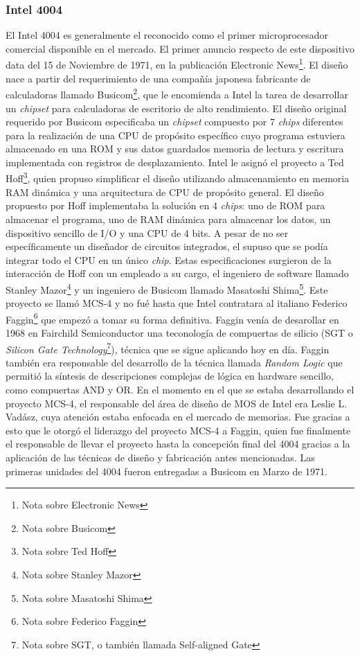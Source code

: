 \subsubsection{Intel 4004}

El Intel 4004 es generalmente el reconocido como el primer microprocesador comercial disponible en el mercado. El primer anuncio respecto de este dispositivo data del 15 de Noviembre de 1971, en la publicación Electronic News\footnote{Nota sobre Electronic News}. El diseño nace a partir del requerimiento de una compañía japonesa fabricante de calculadoras llamado Busicom\footnote{Nota sobre Busicom}, que le encomienda a Intel la tarea de desarrollar un \emph{chipset} para calculadoras de escritorio de alto rendimiento. El diseño original requerido por Busicom especificaba un \emph{chipset} compuesto por 7 \emph{chips} diferentes para la realización de una CPU de propósito específico cuyo programa estuviera almacenado en una ROM y sus datos guardados memoria de lectura y escritura implementada con registros de desplazamiento. Intel le asignó el proyecto a Ted Hoff\footnote{Nota sobre Ted Hoff}, quien propuso simplificar el diseño utilizando almacenamiento en memoria RAM dinámica y una arquitectura de CPU de propósito general. El diseño propuesto por Hoff implementaba la solución en 4 \emph{chips}: uno de ROM para almacenar el programa, uno de RAM dinámica para almacenar los datos, un dispositivo sencillo de I/O y una CPU de 4 bits. A pesar de no ser específicamente un diseñador de circuitos integrados, el supuso que se podía integrar todo el CPU en un único \emph{chip}. Estas especificaciones surgieron de la interacción de Hoff con un empleado a su cargo, el ingeniero de software llamado Stanley Mazor\footnote{Nota sobre Stanley Mazor} y un ingeniero de Busicom llamado Masatoshi Shima\footnote{Nota sobre Masatoshi Shima}. Este proyecto se llamó MCS-4 y no fué hasta que Intel contratara al italiano Federico Faggin\footnote{Nota sobre Federico Faggin} que empezó a tomar su forma definitiva. Faggin venía de desarollar en 1968 en Fairchild Semiconductor una teconología de compuertas de silicio (SGT o \emph{Silicon Gate Technology}\footnote{Nota sobre SGT, o también llamada Self-aligned Gate}), técnica que se sigue aplicando hoy en día. Faggin también era responsable del desarrollo de la técnica llamada \emph{Random Logic} que permitió la síntesis de descripciones complejas de lógica en hardware sencillo, como compuertas AND y OR. En el momento en el que se estaba desarrollando el proyecto MCS-4, el responsable del área de diseño de MOS de Intel era Leslie L. Vadász, cuya atención estaba enfocada en el mercado de memorias. Fue gracias a esto que le otorgó el liderazgo del proyecto MCS-4 a Faggin, quien fue finalmente el responsable de llevar el proyecto hasta la concepción final del 4004 gracias a la aplicación de las técnicas de diseño y fabricación antes mencionadas. Las primeras unidades del 4004 fueron entregadas a Busicom en Marzo de 1971.

